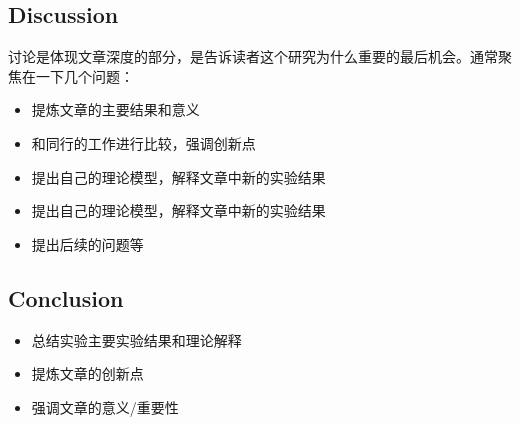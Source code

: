 \documentclass[onecolumn,oneside]{BUPTHomework}
\begin{document}
  \subsection*{Discussion}

  讨论是体现文章深度的部分，是告诉读者这个研究为什么重要的最后机会。通常聚焦在一下几个问题：

  \begin{itemize}
    \item 提炼文章的主要结果和意义
    \item 和同行的工作进行比较，强调创新点
    \item 提出自己的理论模型，解释文章中新的实验结果
    \item 提出自己的理论模型，解释文章中新的实验结果
    \item 提出后续的问题等
  \end{itemize}

  \subsection*{Conclusion}

  \begin{itemize}
    \item 总结实验主要实验结果和理论解释
    \item 提炼文章的创新点
    \item 强调文章的意义/重要性
  \end{itemize}
\end{document}
